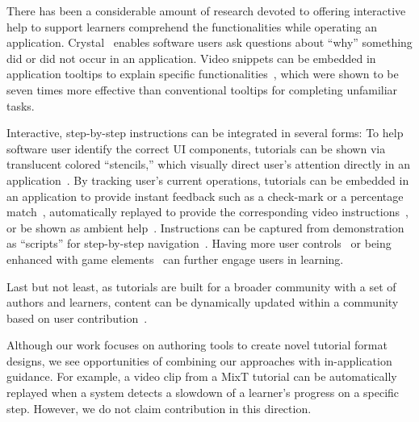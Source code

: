 There has been a considerable amount of research devoted to offering interactive help to support learners comprehend the functionalities while operating an application.
%
Crystal~\cite{Myers:2006:AWW:1124772.1124832} enables software users ask questions about ``why'' something did or did not occur in an application.
%
Video snippets can be embedded in application tooltips to explain specific functionalities~\cite{Grossman:2010wr}, which were shown to be seven times more effective than conventional tooltips for completing unfamiliar tasks.

Interactive, step-by-step instructions can be integrated in several forms:
%
To help software user identify the correct UI components, tutorials can be shown via translucent colored ``stencils,'' which visually direct user's attention directly in an application~\cite{Kelleher:2005:STD:1054972.1055047}.
%
By tracking user's current operations, tutorials can be embedded in an application to provide instant feedback such as a check-mark or a percentage match~\cite{Fernquist:2011:SRE:2047196.2047245}, automatically replayed to provide the corresponding video instructions~\cite{Pongnumkul:2011ju}, or be shown as ambient help~\cite{Matejka:2011:AH:1978942.1979349}.
%
Instructions can be captured from demonstration as ``scripts'' for step-by-step navigation~\cite{Bergman:2005:DocWizards}. Having more user controls~\cite{Lieberman:2014:SML:2557500.2557543} or being enhanced with game elements~\cite{Li:2014:CGM:2556288.2556954, Dontcheva:2014:CCL:2556288.2557217} can further engage users in learning.

Last but not least, as tutorials are built for a broader community with a set of authors and learners, content can be dynamically updated within a community based on user contribution~\cite{Lafreniere:2013ff,Matejka:2009:CCR:1622176.1622214, Bunt:2014:TPI:2556288.2557118}.

Although our work focuses on authoring tools to create novel tutorial format designs, we see opportunities of combining our approaches with in-application guidance. For example, a video clip from a MixT tutorial can be automatically replayed when a system detects a slowdown of a learner's progress on a specific step. However, we do not claim contribution in this direction.


